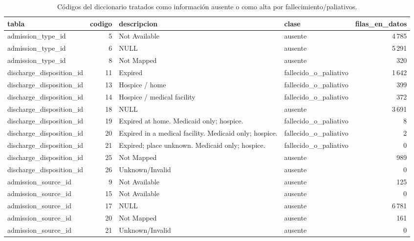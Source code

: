 \documentclass[11pt,a4paper]{article}
\newenvironment{tablaentex}[2]{%
  \begin{table}[H]\centering\small\caption{#1}\label{#2}\begin{adjustbox}{max width=\textwidth}}%
  {\end{adjustbox}\end{table}}
\begin{document}
\begin{tablaentex}{Códigos del diccionario tratados como información ausente o como alta por fallecimiento/paliativos.}{tab:codigos}
\begin{tabular}{lrllr}
\toprule
tabla & codigo & descripcion & clase & filas\_en\_datos \\
\midrule
admission\_type\_id & 5 & Not Available & ausente & 4\,785 \\
admission\_type\_id & 6 & NULL & ausente & 5\,291 \\
admission\_type\_id & 8 & Not Mapped & ausente & 320 \\
discharge\_disposition\_id & 11 & Expired & fallecido\_o\_paliativo & 1\,642 \\
discharge\_disposition\_id & 13 & Hospice / home & fallecido\_o\_paliativo & 399 \\
discharge\_disposition\_id & 14 & Hospice / medical facility & fallecido\_o\_paliativo & 372 \\
discharge\_disposition\_id & 18 & NULL & ausente & 3\,691 \\
discharge\_disposition\_id & 19 & Expired at home. Medicaid only; hospice. & fallecido\_o\_paliativo & 8 \\
discharge\_disposition\_id & 20 & Expired in a medical facility. Medicaid only; hospice. & fallecido\_o\_paliativo & 2 \\
discharge\_disposition\_id & 21 & Expired; place unknown. Medicaid only; hospice. & fallecido\_o\_paliativo & 0 \\
discharge\_disposition\_id & 25 & Not Mapped & ausente & 989 \\
discharge\_disposition\_id & 26 & Unknown/Invalid & ausente & 0 \\
admission\_source\_id & 9 & Not Available & ausente & 125 \\
admission\_source\_id & 15 & Not Available & ausente & 0 \\
admission\_source\_id & 17 & NULL & ausente & 6\,781 \\
admission\_source\_id & 20 & Not Mapped & ausente & 161 \\
admission\_source\_id & 21 & Unknown/Invalid & ausente & 0 \\
\bottomrule
\end{tabular}
\end{tablaentex}
\end{document}
